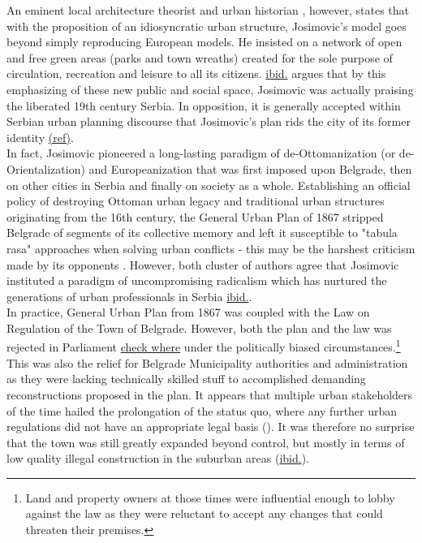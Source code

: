 \documentclass[11pt]{report}
\begin{document}
An eminent local architecture theorist and urban historian \href{ref}{\citealt{blagojevic_urban_2009}}, however, states that with the proposition of an idiosyncratic urban structure, Josimovic's model goes beyond simply reproducing European models.
He insisted on a network of open and free green areas (parks and town wreaths) created for the sole purpose of circulation, recreation and leisure to all its citizens. \href{ref}{ibid.} argues that by this emphasizing of  these new public and social space, Josimovic was actually praising the liberated 19th century Serbia.
In opposition, it is generally accepted within Serbian urban planning discourse that Josimovic's plan rids the city of its former identity \href{ref}{(ref)}.
\\

In fact, Josimovic pioneered a long-lasting paradigm of de-Ottomanization (or de-Orientalization) and Europeanization that was first imposed upon Belgrade, then on other cities in Serbia and finally on society as a whole. Establishing an official policy of destroying Ottoman urban legacy and traditional urban structures originating from the 16th century, the General Urban Plan of 1867 stripped Belgrade of segments of its collective memory and left it susceptible to "tabula rasa" approaches when solving urban conflicts - this may be the harshest criticism made by its opponents \href{ref}{\citealt{doytchinov_modernization_2015}}.
However, both cluster of authors agree that Josimovic instituted a paradigm of uncompromising radicalism which has nurtured the generations of urban professionals in Serbia \href{ref}{ibid.}.
\\

In practice, General Urban Plan from 1867 was coupled with the Law on Regulation of the Town of Belgrade. However, both the plan and the law was rejected in Parliament \href{ref}{check where} under the politically biased circumstances.\footnote{Land and property owners at those times were influential enough to lobby against the law as they were reluctant to accept any changes that could threaten their premises.}
This was also the relief for Belgrade Municipality authorities and administration as they were lacking technically skilled stuff to accomplished demanding reconstructions proposed in the plan.
It appears that multiple urban stakeholders of the time hailed the prolongation of the status quo, where any further urban regulations did not have an appropriate legal basis (\href{ref}{\citealt{doytchinov_modernization_2015}}). It was therefore no surprise that the town was still greatly  expanded  beyond  control,  but mostly in terms of  low quality illegal  construction  in the suburban areas (\href{ref}{ibid.}).
\\
\end{document}
